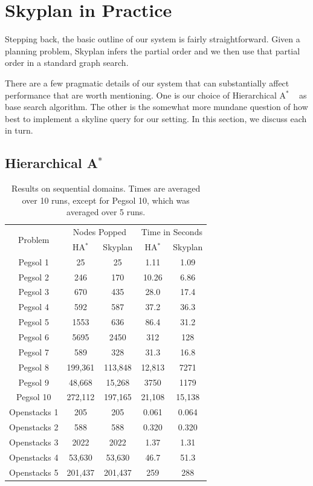 \documentclass[letterpaper]{article}
\theoremstyle{plain} \newtheorem{theorem}{Theorem} \newtheorem{proposition}{Proposition} \newtheorem{lemma}{Lemma}
\theoremstyle{definition} \newtheorem{definition}{Definition} \newtheorem{conjecture}{Conjecture} \newtheorem*{example}{Example}
\theoremstyle{remark} \newtheorem*{remark}{Remark} \newtheorem*{note}{Note} \newtheorem{case}{Case}
\newcommand{\Astar}{A$^*$ }
\begin{document}
\section{Skyplan in Practice}

Stepping back, the basic outline of our system is fairly straightforward.
Given a planning problem, Skyplan infers the partial order
and we then use that partial order in a standard graph search.

There are a few pragmatic details of our system that can substantially
affect performance that are worth mentioning. One is our choice of
Hierarchical \Astar~\citep{holte1996hierarchical} as base search
algorithm. The
other is the somewhat more mundane question of how best to implement
a skyline query for our setting.  In this section, we discuss each
in turn.

\subsection{Hierarchical \Astar}
\begin{table}
	\begin{center}
		\begin{tabular}{|c|cc|cc|}
			\hline
			\multirow{2}{*}{Problem} & \multicolumn{2}{c|}{Nodes Popped} & \multicolumn{2}{c|}{Time in Seconds} \\
			& H\Astar & Skyplan & H\Astar & Skyplan \\
			\hline
			Pegsol 1 & 25 & 25 & 1.11 & 1.09 \\
			Pegsol 2 & 246 & 170 & 10.26 & 6.86 \\
			Pegsol 3 & 670 & 435 & 28.0 & 17.4 \\
			Pegsol 4 & 592 & 587 & 37.2 & 36.3 \\
			Pegsol 5 & 1553 & 636 & 86.4 & 31.2 \\
			Pegsol 6 & 5695 & 2450 & 312 & 128 \\
			Pegsol 7 & 589 & 328 & 31.3 & 16.8 \\
			Pegsol 8 & 199,361 & 113,848 & 12,813 & 7271 \\
			Pegsol 9 & 48,668 & 15,268 & 3750 & 1179 \\
			Pegsol 10 & 272,112 & 197,165 & 21,108 & 15,138 \\
			\hline
			Openstacks 1 & 205 & 205 & 0.061 & 0.064 \\
			Openstacks 2 & 588 & 588 & 0.320 & 0.320 \\
			Openstacks 3 & 2022 & 2022 & 1.37 & 1.31 \\
			Openstacks 4 & 53,630 & 53,630 & 46.7 & 51.3 \\
			Openstacks 5 & 201,437 & 201,437 & 259 & 288 \\
			\hline
		\end{tabular}
	\end{center}
	\caption{Results on sequential domains. Times are averaged over 10 runs, except for Pegsol 10, which was averaged over 5 runs.}
	\label{tab:seq-opt}
\end{table}
\end{document}
